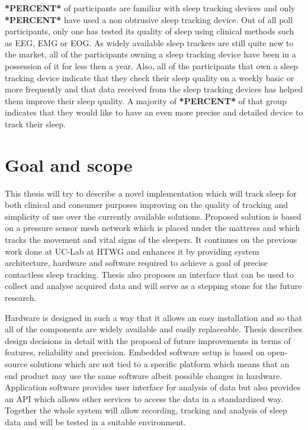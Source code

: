 \textbf{*PERCENT*} of participants are familiar with sleep tracking devices and only \textbf{*PERCENT*} have used a non obtrusive sleep tracking device. Out of all poll participants, only one has tested its quality of sleep using clinical methods such as \ac{EEG}, \ac{EMG} or \ac{EOG}. As widely available sleep trackers are still quite new to the market, all of the participants owning a sleep tracking device have been in a possession of it for less then a year. Also, all of the participants that own a sleep tracking device indicate that they check their sleep quality on a weekly basic or more frequently and that data received from the sleep tracking devices has helped them improve their sleep quality. A majority of \textbf{*PERCENT*} of that group indicates that they would like to have an even more precise and detailed device to track their sleep.


\section{Goal and scope}

This thesis will try to describe a novel implementation which will track sleep for both clinical and consumer purposes improving on the quality of tracking and simplicity of use over the currently available solutions. Proposed solution is based on a pressure sensor mesh network which is placed under the mattress and which tracks the movement and vital signs of the sleepers. It continues on the previous work done at \ac{UC-Lab} at \ac{HTWG} and enhances it by providing system architecture, hardware and software required to achieve a goal of precise contactless sleep tracking. Thesis also proposes an interface that can be used to collect and analyse acquired data and will serve as a stepping stone for the future research.

Hardware is designed in such a way that it allows an easy installation and so that all of the components are widely available and easily replaceable. Thesis describes design decisions in detail with the proposal of future improvements in terms of features, reliability and precision. Embedded software setup is based on open-source solutions which are not tied to a specific platform which means that an end product may use the same software albeit possible changes in hardware. Application software provides user interface for analysis of data but also provides an \ac{API} which allows other services to access the data in a standardized way. Together the whole system will allow recording, tracking and analysis of sleep data and will be tested in a suitable environment.

